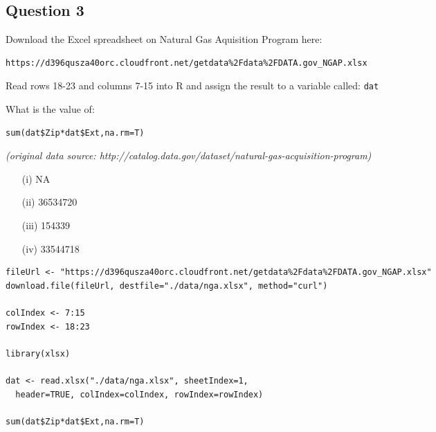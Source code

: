 \documentclass[]{article}
\begin{document}
\newpage
\subsection*{Question 3}

Download the Excel spreadsheet on Natural Gas Aquisition Program here: 

\begin{verbatim}
https://d396qusza40orc.cloudfront.net/getdata%2Fdata%2FDATA.gov_NGAP.xlsx 
\end{verbatim}

Read rows 18-23 and columns 7-15 into R and assign the result to a variable called:  \texttt{dat}  
\bigskip

What is the value of:  
\begin{framed}
\begin{verbatim}
sum(dat$Zip*dat$Ext,na.rm=T)  
\end{verbatim}
\end{framed}


\noindent \textit{(original data source: http://catalog.data.gov/dataset/natural-gas-acquisition-program)}

\begin{itemize} 
\item[(i)] NA 

\item[(ii)] 36534720 

\item[(iii)]  154339 

\item[(iv)] 33544718 
\end{itemize} 
\newpage
\begin{framed}
\begin{verbatim}
fileUrl <- "https://d396qusza40orc.cloudfront.net/getdata%2Fdata%2FDATA.gov_NGAP.xlsx"
download.file(fileUrl, destfile="./data/nga.xlsx", method="curl")

colIndex <- 7:15
rowIndex <- 18:23

library(xlsx)

dat <- read.xlsx("./data/nga.xlsx", sheetIndex=1, 
  header=TRUE, colIndex=colIndex, rowIndex=rowIndex)

sum(dat$Zip*dat$Ext,na.rm=T) 
\end{verbatim}
\end{framed}




\newpage
\end{document}
